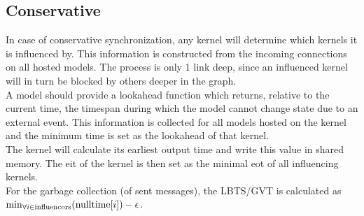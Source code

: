 \subsection{Conservative}
In case of conservative synchronization, any kernel will determine which kernels it is influenced by. This information is constructed from the incoming connections on all hosted models. The process is only 1 link deep, since an influenced kernel will in turn be blocked by others deeper in the graph.\\
A model should provide a lookahead function which returns, relative to the current time, the timespan during which the model cannot change state due to an external event. This information is collected for all models hosted on the kernel and the minimum time is set as the lookahead of that kernel. \\
The kernel will calculate its earliest output time and write this value in shared memory. The eit of the kernel is then set as the minimal eot of all influencing kernels. \\
For the garbage collection (of sent messages), the LBTS/GVT is calculated as $\min_{\forall i \in \textup{influencors}}( \textup{nulltime}[i])  - \epsilon $.\\

